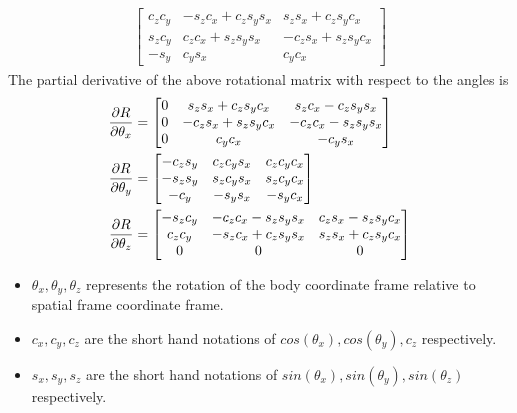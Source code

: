 \begin{enumerate}
\begin{equation}
\begin{split}
\begin{bmatrix}
		c_zc_y &-s_zc_x+c_zs_ys_x &s_zs_x+c_zs_yc_x\\
		s_zc_y &c_zc_x+s_zs_ys_x &-c_zs_x+s_zs_yc_x\\
		-s_y &c_ys_x &c_yc_x
		\end{bmatrix}
	\end{split}
\end{equation}
The partial derivative of the above rotational matrix with respect to the angles is
\begin{equation}
	\begin{split}	
		\frac{\partial {R}}{\partial {\theta_x}} &=
		\begin{bmatrix}
		0 &s_zs_x+c_zs_yc_x &s_zc_x-c_zs_ys_x \\
		0 &-c_zs_x+s_zs_yc_x &-c_zc_x-s_zs_ys_x \\
		0 &c_yc_x &-c_ys_x
		\end{bmatrix}\\
		\frac{\partial {R}}{\partial {\theta_y}} &=
		\begin{bmatrix}
		-c_zs_y &c_zc_ys_x &c_zc_yc_x \\
		-s_zs_y &s_zc_ys_x &s_zc_yc_x \\
		-c_y &-s_ys_x &-s_yc_x
		\end{bmatrix}\\
		\frac{\partial {R}}{\partial {\theta_z}} &=
		\begin{bmatrix}
		-s_zc_y &-c_zc_x-s_zs_ys_x &c_zs_x-s_zs_yc_x \\
		c_zc_y &-s_zc_x+c_zs_ys_x &s_zs_x+c_zs_yc_x\\
		0 &0 &0
		\end{bmatrix}
	\end{split}
\end{equation}
\begin{itemize}
\item $ \theta_x, \theta_y, \theta_z $ represents the rotation of the body coordinate frame relative to spatial frame coordinate frame.
\item $ c_x,c_y,c_z $ are the short hand notations of $cos(\theta_x), cos(\theta_y), c_z$ respectively.
\item $ s_x,s_y,s_z $ are the short hand notations of $sin(\theta_x), sin(\theta_y), sin(\theta_z)$ respectively.
\end{itemize}
\end{enumerate}
